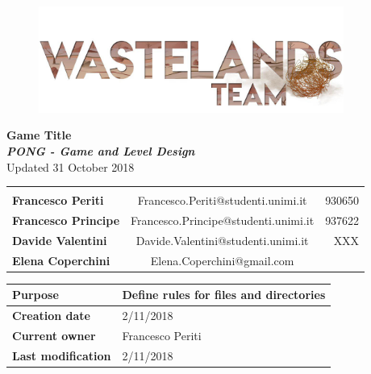 \documentclass[12pt]{article}
\begin{document}
\begin{center}
  \begin{figure}
    \centering
  \vspace*{5\baselineskip}
  \includegraphics[width=10cm]{Images/logoTeam}
  \end{figure}

  {\large \textbf{Game Title}} \\
  \textbf{\textit{PONG - Game and Level Design}} \\
  {\small Updated 31 October 2018} \\

\begin{tabular}{lcr}\\\\
\textbf{Francesco Periti}    & Francesco.Periti@studenti.unimi.it   & 930650\\
\textbf{Francesco Principe}  & Francesco.Principe@studenti.unimi.it & 937622\\
\textbf{Davide Valentini}    & Davide.Valentini@studenti.unimi.it   & XXX\\
\textbf{Elena Coperchini}   & Elena.Coperchini@gmail.com &\\
\end{tabular}


\begin{table}[]
  \begin{tabular}{|l|l||}
    \hline
    \cellcolor{gray}\textbf{Purpose} &  Define rules for files and directories \\\hline
    \cellcolor{gray}\textbf{Creation date} & 2/11/2018 \\\hline
    \cellcolor{gray}\textbf{Current owner} & Francesco Periti \\\hline
    \cellcolor{gray}\textbf{Last modification} & 2/11/2018\\   \hline
  \end{tabular}
\end{table}


\end{center}
\end{document}
